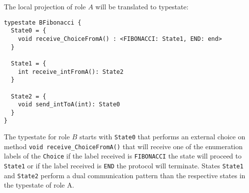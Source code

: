 The local projection of role $A$ will be translated to typestate:

\begin{lstlisting}[caption={Typestate for Role A}]
typestate BFibonacci {
  State0 = {
    void receive_ChoiceFromA() : <FIBONACCI: State1, END: end>
  }

  State1 = {
    int receive_intFromA(): State2
  }

  State2 = {
    void send_intToA(int): State0
  }
}
\end{lstlisting}

The typestate for role $B$ starts with \lstinline|State0|
that performs an external choice on method
\lstinline|void receive_ChoiceFromA()| that will receive
one of the enumeration labels of the \lstinline|Choice|
if the label received is \lstinline|FIBONACCI| the state
will proceed to \lstinline|State1| or if the label
received is \lstinline|END| the protocol will terminate.
States \lstinline|State1| and \lstinline|State2| perform
a dual communication pattern than the respective states
in the typestate of role A.


\begin{comment}
We could refine the automated code to be more readable:
\begin{lstlisting}
typestate AFibonacci {
  Fibonacci = {
    void send_fibonacciToB() : PingPong,
    void send_endToB() : end,
  }

  PingPong	=	{
    void send_intToB(int): { 
      int receive_intFromB(): Fibonacci
    }
  }
}
\end{lstlisting}

\begin{lstlisting}
typestate BFibonacci {
  Fibonacci = {
    void receive_ChoiceFromA() : <FIBONACCI: PingPong, END: end>
  }

  PingPong = {
    int receive_intFromA(): {
      void send_intToA(int): State0
    }
  }
}
\end{lstlisting}
\end{comment}


